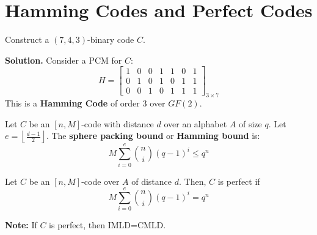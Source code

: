 \section{Hamming Codes and Perfect Codes}

\begin{exbox}
    \begin{example}
        Construct a $ (7,4,3) $-binary code $ C $.

        \textbf{Solution.}
        Consider a PCM for $ C $:
        \[H= \left[
                \begin{array}{ccc|cccc}
                    1 & 0 & 0 & 1 & 1 & 0 & 1 \\
                    0 & 1 & 0 & 1 & 0 & 1 & 1 \\
                    0 & 0 & 1 & 0 & 1 & 1 & 1
                \end{array} \right]_{3\times 7} \]
        This is a \textbf{Hamming Code} of order $ 3 $ over $ GF(2) $.
    \end{example}
\end{exbox}

\begin{defbox}
    \begin{definition}
        Let $ C $ be an $ [n,M] $-code with distance $ d $ over an
        alphabet $ A $ of size $ q $. Let $ e=\left\lfloor \frac{d-1}{2} \right\rfloor $.
        The \textbf{sphere packing bound} or \textbf{Hamming bound} is:
        \[ M \sum\limits_{i=0}^{e} \binom{n}{i}(q-1)^i\leqslant q^n \]
    \end{definition} \end{defbox}

\begin{defbox}
    \begin{definition}
        Let $ C $ be an $ [n,M] $-code over $ A $ of distance $ d $. Then,
        $ C $ is perfect if
        \[ M \sum\limits_{i=0}^{e} \binom{n}{i}(q-1)^i = q^n \]
    \end{definition} \end{defbox}

\textbf{Note:} If $ C $ is perfect, then IMLD=CMLD.
